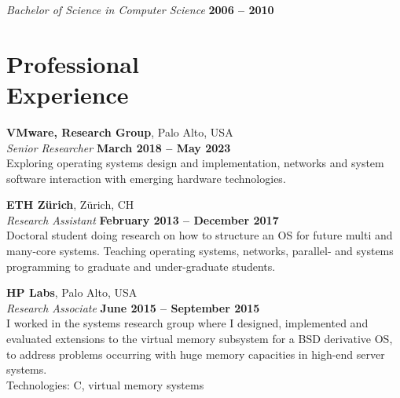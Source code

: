 \documentclass[margin,line]{cv/cv}
\begin{document}
\begin{resume}
    \textsl{Bachelor of Science in Computer Science} \hfill \textbf{2006 -- 2010}\vspace{-3mm}\\\vspace{-1mm}%


    \section{\mysidestyle Professional\\Experience}

    \textbf{VMware, Research Group}, Palo Alto, USA \vspace{2mm}\\\vspace{1mm}%
    \textsl{Senior Researcher} \hfill \textbf{March 2018 -- May 2023}\\
    Exploring operating systems design and implementation, networks
    and system software interaction with emerging hardware technologies.

    \textbf{ETH Zürich}, Zürich, CH \vspace{2mm}\\\vspace{1mm}%
    \textsl{Research Assistant} \hfill \textbf{February 2013 -- December 2017}\\
    Doctoral student doing research on how to structure an OS for future multi and
    many-core systems. Teaching operating systems, networks, parallel- and systems programming
    to graduate and under-graduate students.

    \textbf{HP Labs}, Palo Alto, USA \vspace{2mm}\\\vspace{1mm}%
    \textsl{Research Associate} \hfill \textbf{June 2015 -- September 2015}\\
    I worked in the systems research group where I designed, implemented and
    evaluated extensions to the virtual memory subsystem for a BSD derivative OS,
    to address problems occurring with huge memory capacities in high-end server
    systems.\\ Technologies: C, virtual memory systems


\end{resume}
\end{document}
